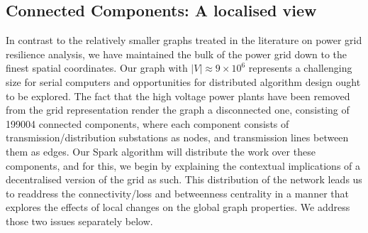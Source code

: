 \subsection{Connected Components: A localised view}
In contrast to the relatively smaller graphs treated in the literature on power grid resilience analysis, we have maintained the bulk of the power grid down to the finest spatial coordinates. Our graph with $\left \vert V \right \vert \approx 9 \times 10^6 $ represents a challenging size for serial computers and opportunities for distributed algorithm design ought to be explored. The fact that the high voltage power plants have been removed from the grid representation render the graph a disconnected one, consisting of 199004 connected components, where each component consists of transmission/distribution substations as nodes, and transmission lines between them as edges. Our Spark algorithm will distribute the work over these components, and for this, we begin by explaining the contextual implications of a decentralised version of the grid as such. This distribution of the network leads us to readdress the connectivity/loss and betweenness centrality in a manner that explores the effects of local changes on the global graph properties. We address those two issues separately below.

